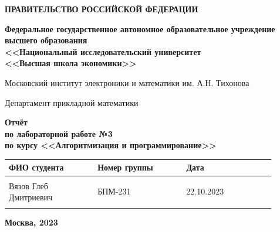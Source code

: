 \documentclass[12pt]{article}
\begin{document}
\thispagestyle{empty}
\begin{center}
\textbf{ПРАВИТЕЛЬСТВО РОССИЙСКОЙ ФЕДЕРАЦИИ}

\vspace{5ex}
	
\textbf{Федеральное государственное автономное образовательное учреждение \\ высшего образования \\ <<Национальный исследовательский университет \\ <<Высшая школа экономики>>}
\end{center}
\vspace{5ex}

\begin{center}
    Московский институт электроники и математики им. А.Н. Тихонова  
    
    \vspace{5ex}
    
    Департамент прикладной математики
    
    \vspace{10ex}
    \textbf{Отчёт \\ по лабораторной работе №3 \\ по курсу <<Алгоритмизация и программирование>>}
	\vspace{7ex}

\end{center}

\begin{center} 
\begin{tabular}{| p{0.3\linewidth}| p{0.3\linewidth}| p{0.3\linewidth}|}
 \hline	
ФИО студента & Номер группы & Дата \\  \hline
 & & \\  
Вязов Глеб \newline Дмитриевич & БПМ-231 & 22.10.2023\\  
 & & \\  \hline		
\end{tabular}
\end{center}

\begin{center}
	\vspace{3ex}
	
	\vfill
   
   \normalsize
    
	\textbf{Москва, 2023}
\end{center}

\newpage

\end{document}
